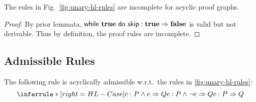 \begin{theorem}
    The rules in Fig.~\ref{fig:unary-hl-rules}
    are incomplete for acyclic proof graphs. 
\end{theorem}
\begin{proof}
By prior lemmata,
$\Triple {\While {\True} do {\Skip} } : \True => \False$
is valid but not derivable.
Thus by definition, the proof rules are incomplete.
\end{proof}



\subsection{Admissible Rules}

\begin{conjecture}
    The following rule is acyclically admissible w.r.t.\
    the rules in \ref{fig:unary-hl-rules}:
    \[ \inferrule*[right=HL-Case]{
        \Triple c : P \wedge e => Q \\
        \Triple c : P \wedge \neg e => Q
    }{
        \Triple c : P => Q
    }
    \]
\end{conjecture}